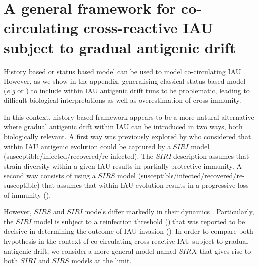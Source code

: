 



\section{A general framework for co-circulating cross-reactive
  IAU subject to gradual antigenic drift}

History based or status based model can be used to model
co-circulating IAU \citep{Gog2002a}. However, as we show in the
appendix, generalising classical status based model (\textit{e.g}
\citet{Gog2002a} or \citet{Gog2002}) to include within IAU antigenic
drift tuns to be problematic, leading to difficult biological
interpretations as well as overestimation of cross-immunity.

In this context, history-based framework appears to be a more natural
alternative where gradual antigenic drift within IAU can be introduced
in two ways, both biologically relevant. A first way was previously
explored by \citet{Goekaydin2007} who considered that within IAU
antigenic evolution could be captured by a $SIRI$ model
(susceptible/infected/recovered/re-infected). The $SIRI$ description
assumes that strain diversity within a given IAU results in partially
protective immunity.
%
A second way consists of using a $SIRS$ model
(susceptible/infected/recovered/re-susceptible) that assumes that
within IAU evolution results in a progressive loss of immunity
(\citet{Pease1987, Shih2007}).
 
However, $SIRS$ and $SIRI$ models differ markedly in their dynamics
\citet{Gomes2004a}. Particularly, the $SIRI$ model is subject to a
reinfection threshold (\citet{Gomes2004a}) that was reported to be
decisive in determining the outcome of IAU invasion
(\citet{Goekaydin2007}). In order to compare both hypothesis in the
context of co-circulating cross-reactive IAU subject to gradual
antigenic drift, we consider a more general model named $SIRX$ that
gives rise to both $SIRI$ and $SIRS$ models at the limit.



